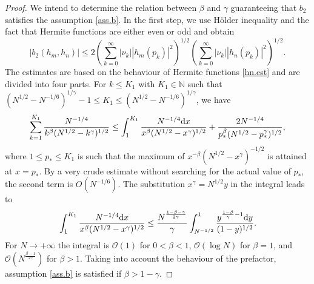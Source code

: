 \begin{proof} 
We intend to determine the relation between $\beta$ and $\gamma$ guaranteeing that $b_2$ satisfies the assumption \eqref{ass.b}. In the first step, we use H\"older inequality and the fact that Hermite functions are either even or odd and obtain
\begin{equation*}
|b_2(h_m,h_n)| \leq 
2 \left(
\sum_{k =0}^{\infty} |\nu_k| |h_m(p_k)|^2
\right)^{1/2}
\left(
\sum_{k =0}^{\infty} |\nu_k| |h_n(p_k)|^2
\right)^{1/2}.
\end{equation*}
The estimates are based on the behaviour of Hermite functions \eqref{hn.est} and are divided into four parts.
For $ k \leq K_1$ with $K_1 \in {\mathbb{N}}$ such that $(N^{1/2} - N^{-1/6})^{1/\gamma}-1 \leq K_1 \leq (N^{1/2} - N^{-1/6})^{1/\gamma}$, we have
\begin{equation*}
\sum_{k=1}^{K_1} \frac{N^{-1/4}}{k^{\beta}(N^{1/2}-k^{\gamma})^{1/2}  } 
\leq 
 \int_1^{K_1} \frac{N^{-1/4} {{{\rm d}}} x}{x^\beta (N^{1/2}-x^\gamma)^{1/2} }
 +  \frac{2N^{-1/4}}{p_*^\beta (N^{1/2}-p_*^{\gamma})^{1/2}  },
\end{equation*} 
where $1 \leq p_* \leq K_1$ is such that the maximum of $x^{-\beta}(N^{1/2}-x^{\gamma})^{-1/2}$ is attained at $x=p_*$.  By a very crude estimate without searching for the actual value of $p_*$, the second term is $O(N^{-1/6})$. The substitution $x^{\gamma} = N^{1/2} y$ in the integral leads to
\begin{equation*}
\int_1^{K_1} \frac{ N^{-1/4}{{{\rm d}}} x}{x^\beta (N^{1/2}-x^\gamma)^{1/2} }
\leq 
\frac{N^{ \frac{1-\beta -\gamma}{2\gamma} } }{\gamma} 
\int_{N^{-1/2}}^{  1} 
\frac{ y^{ \frac{1-\beta}{\gamma} -1 } {{{\rm d}}} y}{ (1-y)^{1/2}}.
\end{equation*}
For $N \to + \infty$ the integral is $\mathcal{O}(1)$ for $0< \beta < 1$, $\mathcal{O}(\log N)$ for $\beta =1$, and $\mathcal{O}(N^{\frac{\beta-1}{2\gamma}})$ for $\beta >1$.
Taking into account the behaviour of the prefactor,  
assumption \eqref{ass.b} is satisfied if $\beta > 1-\gamma$.


\end{proof}
